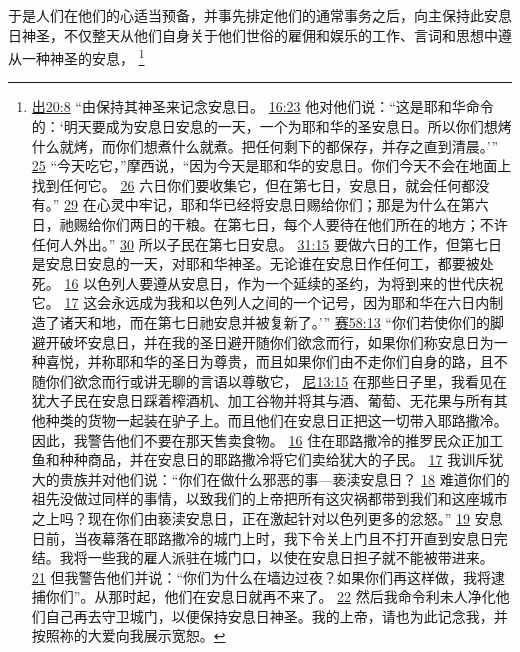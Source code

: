 \documentclass[12pt, a4paper, oneside]{ctexart}
\newcounter{parnum}[section]
\newcommand{\N}{%
   \noindent\refstepcounter{parnum}%
    \makebox[\parindent][l]{\textbf{\arabic{parnum}.}}}
\begin{document}
\N 于是人们在他们的心适当预备，并事先排定他们的通常事务之后，向主保持此安息日神圣，不仅整天从他们自身关于他们世俗的雇佣和娱乐的工作、言词和思想中遵从一种神圣的安息，
	\footnote {
		\href{https://biblehub.com/exodus/20-8.htm}{出20:8} “由保持其神圣来记念安息日。
		\href{https://biblehub.com/exodus/16-23.htm}{16:23} 他对他们说：“这是耶和华命令的：‘明天要成为安息日安息的一天，一个为耶和华的圣安息日。所以你们想烤什么就烤，而你们想煮什么就煮。把任何剩下的都保存，并存之直到清晨。’”
		\href{https://biblehub.com/exodus/16-25.htm}{25} “今天吃它，”摩西说，“因为今天是耶和华的安息日。你们今天不会在地面上找到任何它。
		\href{https://biblehub.com/exodus/16-26.htm}{26} 六日你们要收集它，但在第七日，安息日，就会任何都没有。”
		\href{https://biblehub.com/exodus/16-29.htm}{29} 在心灵中牢记，耶和华已经将安息日赐给你们；那是为什么在第六日，祂赐给你们两日的干粮。在第七日，每个人要待在他们所在的地方；不许任何人外出。”
		\href{https://biblehub.com/exodus/16-30.htm}{30} 所以子民在第七日安息。
		\href{https://biblehub.com/exodus/31-15.htm}{31:15} 要做六日的工作，但第七日是安息日安息的一天，对耶和华神圣。无论谁在安息日作任何工，都要被处死。
		\href{https://biblehub.com/exodus/31-16.htm}{16} 以色列人要遵从安息日，作为一个延续的圣约，为将到来的世代庆祝它。
		\href{https://biblehub.com/exodus/31-17.htm}{17} 这会永远成为我和以色列人之间的一个记号，因为耶和华在六日内制造了诸天和地，而在第七日祂安息并被复新了。’”
		\href{https://biblehub.com/isaiah/58-13.htm}{赛58:13} “你们若使你们的脚避开破坏安息日，并在我的圣日避开随你们欲念而行，如果你们称安息日为一种喜悦，并称耶和华的圣日为尊贵，而且如果你们由不走你们自身的路，且不随你们欲念而行或讲无聊的言语以尊敬它，
		\href{https://biblehub.com/nehemiah/13-15.htm}{尼13:15} 在那些日子里，我看见在犹大子民在安息日踩着榨酒机、加工谷物并将其与酒、葡萄、无花果与所有其他种类的货物一起装在驴子上。而且他们在安息日正把这一切带入耶路撒冷。因此，我警告他们不要在那天售卖食物。
		\href{https://biblehub.com/nehemiah/13-16.htm}{16} 住在耶路撒冷的推罗民众正加工鱼和种种商品，并在安息日的耶路撒冷将它们卖给犹大的子民。
		\href{https://biblehub.com/nehemiah/13-17.htm}{17} 我训斥犹大的贵族并对他们说：“你们在做什么邪恶的事---亵渎安息日？
		\href{https://biblehub.com/nehemiah/13-18.htm}{18} 难道你们的祖先没做过同样的事情，以致我们的上帝把所有这灾祸都带到我们和这座城市之上吗？现在你们由亵渎安息日，正在激起针对以色列更多的忿怒。”
		\href{https://biblehub.com/nehemiah/13-19.htm}{19} 安息日前，当夜幕落在耶路撒冷的城门上时，我下令关上门且不打开直到安息日完结。我将一些我的雇人派驻在城门口，以使在安息日担子就不能被带进来。
		\href{https://biblehub.com/nehemiah/13-21.htm}{21} 但我警告他们并说：“你们为什么在墙边过夜？如果你们再这样做，我将逮捕你们”。从那时起，他们在安息日就再不来了。
		\href{https://biblehub.com/nehemiah/13-22.htm}{22} 然后我命令利未人净化他们自己再去守卫城门，以便保持安息日神圣。我的上帝，请也为此记念我，并按照祢的大爱向我展示宽恕。
	}
\end{document}
